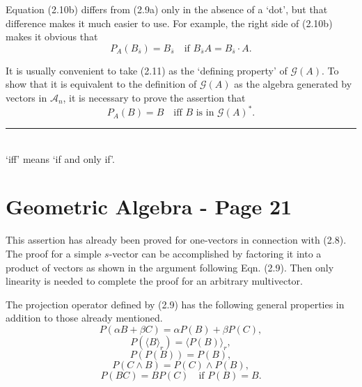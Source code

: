 \documentclass[fleqn]{scrartcl}
\numberwithin{equation}{section}
\begin{document}
\noindent Equation (2.10b) differs from (2.9a) only in the absence of a `dot', but that difference makes it much easier to use. For example, the right side of (2.10b) makes it obvious that
\begin{equation}
P_A(B_{\bar{s}}) = B_{\bar{s}} \quad \text{if } B_{\bar{s}}A = B_{\bar{s}} \cdot A. \tag{2.11}
\end{equation}

\vspace{1em}
\noindent It is usually convenient to take (2.11) as the `defining property' of \(\mathscr{G}(A)\). To show that it is equivalent to the definition of \(\mathscr{G}(A)\) as the algebra generated by vectors in \(\mathscr{A}_n\), it is necessary to prove the assertion that
\begin{equation}
P_A(B) = B \quad \text{iff } B \text{ is in } \mathscr{G}(A)^{\ast}. \tag{2.12}
\end{equation}

\vspace{2em}
\noindent \rule{4cm}{0.4pt} \\
\footnotesize \noindent * `iff' means `if and only if'.

\section*{Geometric Algebra - Page 21}

\noindent This assertion has already been proved for one-vectors in connection with (2.8). The proof for a simple \(s\)-vector can be accomplished by factoring it into a product of vectors as shown in the argument following Eqn. (2.9). Then only linearity is needed to complete the proof for an arbitrary multivector.

\vspace{1em}
\noindent The projection operator defined by (2.9) has the following general properties in addition to those already mentioned.
\begin{equation}
P(\alpha B + \beta C) = \alpha P(B) + \beta P(C), \tag{2.13a}
\end{equation}
\begin{equation}
P(\langle B \rangle_r) = \langle P(B) \rangle_r, \tag{2.13b}
\end{equation}
\begin{equation}
P(P(B)) = P(B), \tag{2.13c}
\end{equation}
\begin{equation}
P(C \wedge B) = P(C) \wedge P(B), \tag{2.13d}
\end{equation}
\begin{equation}
P(BC) = BP(C) \quad \text{if } P(B) = B. \tag{2.13e}
\end{equation}
\end{document}
